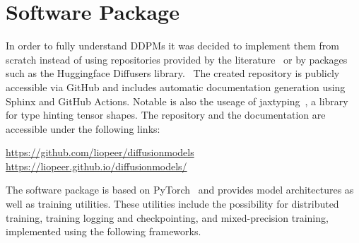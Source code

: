 \section{Software Package}
In order to fully understand DDPMs it was decided to implement them from scratch instead of using repositories provided by the literature~\autocite{nichol2021improved} or by packages such as the Huggingface Diffusers library.~\autocite{huggingfacediffusers} The created repository is publicly accessible via GitHub and includes automatic documentation generation using Sphinx and GitHub Actions. Notable is also the useage of jaxtyping~\autocite{jaxtyping}, a library for type hinting tensor shapes. The repository and the documentation are accessible under the following links:
\begin{center}
    \hyperlink{https://github.com/liopeer/diffusionmodels}{https://github.com/liopeer/diffusionmodels}\\
    \hyperlink{https://liopeer.github.io/diffusionmodels/}{https://liopeer.github.io/diffusionmodels/}
\end{center}
The software package is based on PyTorch~\autocite{paszke2019pytorch} and provides model architectures as well as training utilities. These utilities include the possibility for distributed training, training logging and checkpointing, and mixed-precision training, implemented using the following frameworks.
